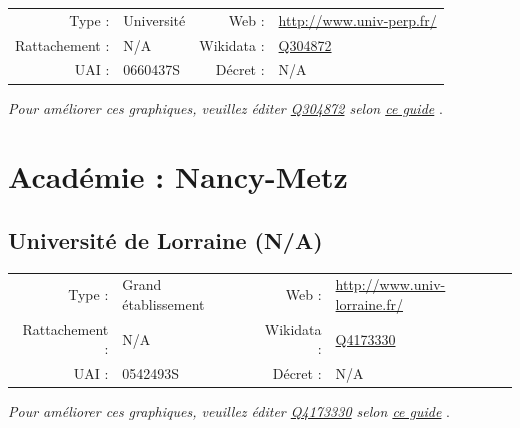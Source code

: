 \documentclass[12pt,french,landscape]{article}
\begin{document}
\begin{tabular*}{0.45\textwidth}{rp{2cm}rl}  
\hline  
Type : & Université & Web : &\href{http://www.univ-perp.fr/}{http://www.univ-perp.fr/} \\  
Rattachement : & N/A & Wikidata : & \href{https://www.wikidata.org/entity/Q304872}{Q304872} \\  
UAI : & 0660437S & Décret : & N/A \\  
\hline  
\end{tabular*}

\textit{\scriptsize Pour améliorer ces graphiques, veuillez éditer \href{https://www.wikidata.org/entity/Q304872}{Q304872}  selon \href{https://github.com/cpesr/wikidataESR/blob/master/Rmd/wikidataESR.md}{ce guide}}
.


\newpage

\hypertarget{acaduxe9mie-nancy-metz}{%
\section{Académie : Nancy-Metz}\label{acaduxe9mie-nancy-metz}}

\hypertarget{universituxe9-de-lorraine-na}{%
\subsection{Université de Lorraine
(N/A)}\label{universituxe9-de-lorraine-na}}

\begin{tabular*}{0.45\textwidth}{rp{2cm}rl}  
\hline  
Type : & Grand établissement & Web : &\href{http://www.univ-lorraine.fr/}{http://www.univ-lorraine.fr/} \\  
Rattachement : & N/A & Wikidata : & \href{https://www.wikidata.org/entity/Q4173330}{Q4173330} \\  
UAI : & 0542493S & Décret : & N/A \\  
\hline  
\end{tabular*}

\textit{\scriptsize Pour améliorer ces graphiques, veuillez éditer \href{https://www.wikidata.org/entity/Q4173330}{Q4173330}  selon \href{https://github.com/cpesr/wikidataESR/blob/master/Rmd/wikidataESR.md}{ce guide}}
.

\end{document}
